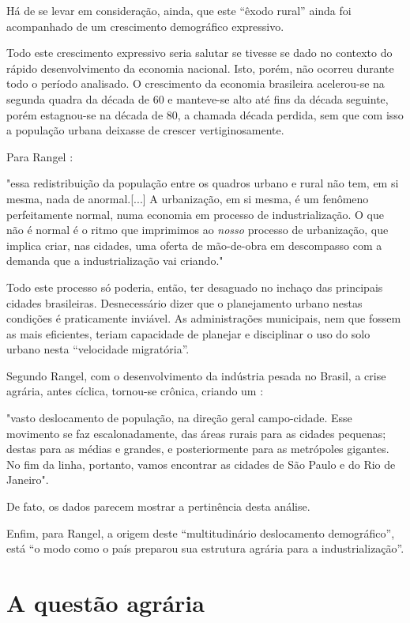 \documentclass[
	12pt,				%
	oneside,			%
	a4paper,			%
	chapter=TITLE,		%
	section=TITLE,		%
	english,			%
	brazil				%
	]{abntex2}
\begin{document}
Há de se levar em consideração, ainda, que este ``êxodo rural'' ainda foi
acompanhado de um crescimento demográfico expressivo.

Todo este crescimento expressivo seria salutar se tivesse se dado no contexto do
rápido desenvolvimento da economia nacional. Isto, porém, não ocorreu durante
todo o período analisado. O crescimento da economia brasileira acelerou-se na
segunda quadra da década de 60 e manteve-se alto até fins da década seguinte,
porém estagnou-se na década de 80, a chamada década perdida, sem que com isso a
população urbana deixasse de crescer vertiginosamente.

Para Rangel \autocite*[151]{rangel1986a}:
\begin{citacao}
"essa redistribuição da população entre os quadros urbano e rural não tem, em si
mesma, nada de anormal.[...] A urbanização, em si mesma, é um fenômeno
perfeitamente normal, numa economia em processo de industrialização. O que não é
normal é o ritmo que imprimimos ao \emph{nosso} processo de urbanização, que
implica criar, nas cidades, uma oferta de mão-de-obra em descompasso com a
demanda que a industrialização vai criando."
\end{citacao}
Todo este processo só poderia, então, ter desaguado no inchaço das principais
cidades brasileiras. Desnecessário dizer que o planejamento urbano nestas
condições é praticamente inviável. As administrações municipais, nem que fossem
as mais eficientes, teriam capacidade de planejar e disciplinar o uso do solo
urbano nesta ``velocidade migratória''.

Segundo Rangel, com o desenvolvimento da indústria pesada no Brasil, a crise
agrária, antes cíclica, tornou-se crônica, criando um \autocite*[156-157]{rangel1988}:
\begin{citacao}
"vasto deslocamento de população, na direção geral campo-cidade. Esse movimento
se faz escalonadamente, das áreas rurais para as cidades pequenas; destas para
as médias e grandes, e posteriormente para as metrópoles gigantes. No fim da
linha, portanto, vamos encontrar as cidades de São Paulo e do Rio de Janeiro".
\end{citacao}
De fato, os dados parecem mostrar a pertinência desta análise.

Enfim, para Rangel, a origem deste ``multitudinário deslocamento demográfico'',
está ``o modo como o país preparou sua estrutura agrária para a industrialização''.

\hypertarget{a-questuxe3o-agruxe1ria}{%
\section{A questão agrária}\label{a-questuxe3o-agruxe1ria}}
\end{document}
